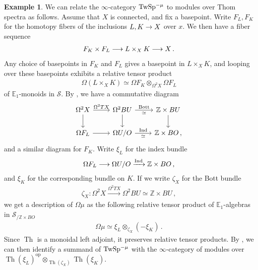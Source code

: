 \documentclass[10pt]{amsart}
\numberwithin{equation}{section}
\theoremstyle{definition}
\newtheorem{ex}[prop]{Example}
\DeclareMathOperator{\Th}{Th}
\DeclareMathOperator{\op}{op}
\DeclareMathOperator{\Ind}{Ind}
\newcommand{\TwSp}{\mathrm{TwSp}\vphantom{h}}
\newcommand{\bE}{\mathbb{E}}
\newcommand{\bZ}{\mathbb{Z}}
\newcommand{\cS}{\mathcal{S}}
\renewcommand{\to}{\mathchoice{\longrightarrow}{\rightarrow}{}{}}
\begin{document}
\begin{ex}
	We can relate the $\infty$-category $\TwSp^{-\mu}$ to modules over Thom spectra as follows.
  Assume that $X$ is connected, and fix a basepoint.
  Write $F_{L},F_{K}$ for the homotopy fibers of the inclusions $L,K\to X$ over $x$.
  We then have a fiber sequence
	\begin{align*}
		F_{K}\times F_{L} \to L\times_{X} K \to X \,.
	\end{align*}
	Any choice of basepoints in $F_{K}$ and $F_{L}$ gives a basepoint in $L\times_{X}K$, and looping over these basepoints exhibits a relative tensor product
	\begin{align*}
		\Omega(L\times_{X} K) \simeq \Omega F_{K} \otimes_{\Omega^{2}X} \Omega F_{L}
	\end{align*}
	of $\bE_{1}$-monoids in $\cS$.
  By \cite[Proposition 2.18]{bonciocat2025floer}, we have a commutative diagram
	\begin{equation*}
		\begin{tikzcd}
			\Omega^{2}X \arrow[r, "\Omega^{2}TX"] \arrow[d]      &   \Omega^{2}BU  \arrow[d]  \arrow[r, "\text{Bott}", "\simeq"'] & \bZ\times BU \arrow[d] \\
			\Omega F_{L}  \arrow[r]               &   \Omega U/O  \arrow[r, "\Ind", "\simeq"']            & \bZ\times BO \,,
		\end{tikzcd}
	\end{equation*}
	and a similar diagram for $F_{K}$.
  Write $\xi_{L}$ for the index bundle
	\begin{align*}
		\Omega F_{L} \to \Omega U/O \xrightarrow{\Ind} \bZ\times BO \, ,
	\end{align*}
	and $\xi_{K}$ for the corresponding bundle on $K$.
  If we write $\zeta_{X}$ for the Bott bundle
	\begin{align*}
		\zeta_{X} \colon \Omega^{2} X \xrightarrow{\Omega^{2}TX} \Omega^{2}BU \simeq \bZ\times BU \,,
	\end{align*}
	we get a description of $\Omega\mu$ as the following relative tensor product of $\bE_{1}$-algebras in $\cS_{/\bZ\times BO}$
	\begin{align*}
		\Omega \mu \simeq \xi_{L} \otimes_{\zeta_{X}} \left(-\xi_{K} \right)  \,.
	\end{align*}
	Since $\Th$ is a monoidal left adjoint, it preserves relative tensor products.
  By , we can then identify a summand of $\TwSp^{-\mu}$ with the $\infty$-category of modules over $\Th(\xi_{L})^{\op }\otimes_{\Th(\zeta_{X})} \Th(\xi_{K})$.
\end{ex}
\end{document}
